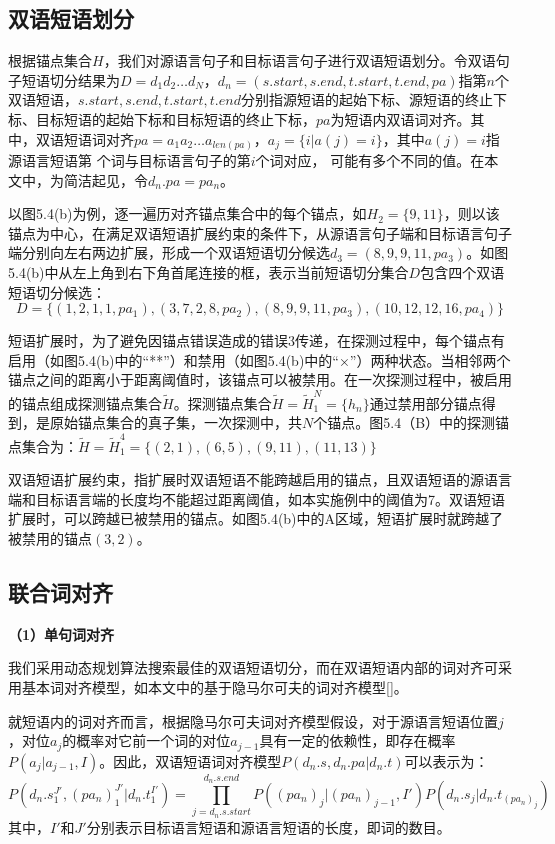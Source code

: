 \subsection{双语短语划分}

根据锚点集合$H$，我们对源语言句子和目标语言句子进行双语短语划分。令双语句子短语切分结果为$D=d_1d_2 \ldots d_N$，$d_n=(s.start, s.end, t.start, t.end, pa)$指第$n$个双语短语，$s.start, s.end, t.start, t.end$分别指源短语的起始下标、源短语的终止下标、目标短语的起始下标和目标短语的终止下标，$pa$为短语内双语词对齐。其中，双语短语词对齐$pa=a_1a_2\ldots a_{len(pa)}$，$a_j=\{i|a(j)=i\}$，其中$a(j)=i$指源语言短语第 个词与目标语言句子的第$i$个词对应， 可能有多个不同的值。在本文中，为简洁起见，令$d_n.pa = pa_n$。

以图5.4(b)为例，逐一遍历对齐锚点集合中的每个锚点，如$H_2=\{9,11\}$，则以该锚点为中心，在满足双语短语扩展约束的条件下，从源语言句子端和目标语言句子端分别向左右两边扩展，形成一个双语短语切分候选$d_3=(8,9,9,11,pa_3)$。如图5.4(b)中从左上角到右下角首尾连接的框，表示当前短语切分集合$D$包含四个双语短语切分候选：
$$D=\{(1, 2, 1, 1, pa_1), (3, 7, 2, 8, pa_2), (8, 9, 9, 11, pa_3), (10, 12, 12, 16, pa_4)\}$$

短语扩展时，为了避免因锚点错误造成的错误3传递，在探测过程中，每个锚点有启用（如图5.4(b)中的“**”）和禁用（如图5.4(b)中的“×”）两种状态。当相邻两个锚点之间的距离小于距离阈值时，该锚点可以被禁用。在一次探测过程中，被启用的锚点组成探测锚点集合$\widetilde{H}$。探测锚点集合$\widetilde{H}=\widetilde{H}_1^{N}=\{h_n\}$通过禁用部分锚点得到，是原始锚点集合的真子集，一次探测中，共$N$个锚点。图5.4（B）中的探测锚点集合为：$\widetilde{H}=\widetilde{H}_1^4 = \{(2,1), (6,5), (9,11), (11,13)\}$

双语短语扩展约束，指扩展时双语短语不能跨越启用的锚点，且双语短语的源语言端和目标语言端的长度均不能超过距离阈值，如本实施例中的阈值为7。双语短语扩展时，可以跨越已被禁用的锚点。如图5.4(b)中的A区域，短语扩展时就跨越了被禁用的锚点$(3,2)$。

\subsection{联合词对齐}

\textbf{（1）单句词对齐}

我们采用动态规划算法搜索最佳的双语短语切分，而在双语短语内部的词对齐可采用基本词对齐模型，如本文中的基于隐马尔可夫的词对齐模型[\cite{Vogel:1996}]。

就短语内的词对齐而言，根据隐马尔可夫词对齐模型假设，对于源语言短语位置$j$，对位$a_j$的概率对它前一个词的对位$a_{j-1}$具有一定的依赖性，即存在概率$P(a_j|a_{j-1},I)$。因此，双语短语词对齐模型$P(d_n.s,d_n.pa|d_n.t)$可以表示为：
\begin{equation}\label{phrase_word_align}
P(d_n.s_1^{J'},(pa_n)_1^{J'}|d_n.t_1^{I'})= \prod_{j=d_n.s.start}^{d_n.s.end} P((pa_n)_j|(pa_n)_{j-1},I') P(d_n.s_j|d_n.t_{(pa_n)_j})
\end{equation}
其中，$I'$和$J'$分别表示目标语言短语和源语言短语的长度，即词的数目。

